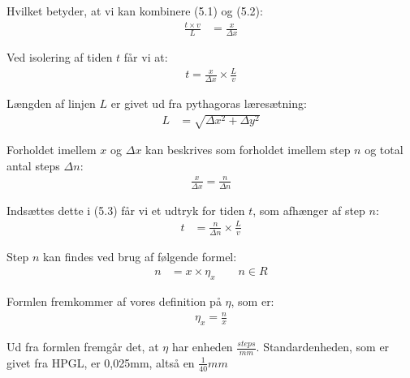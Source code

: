 Hvilket betyder, at vi kan kombinere (5.1) og (5.2):
\begin{align*}
\frac{t \times v}{L} &= \frac{x}{\Delta x}
\end{align*}

Ved isolering af tiden $t$ får vi at:
\begin{align}
t = \frac{x}{\Delta x} \times \frac{L}{v}
\end{align}

Længden af linjen $L$ er givet ud fra pythagoras læresætning:
\begin{align*}
L &= \sqrt{\Delta x^2+\Delta y^2}
\end{align*}

Forholdet imellem $x$ og $\Delta x$ kan beskrives som forholdet imellem step $n$ og total antal steps $\Delta n$:
\begin{align}
\frac{x}{\Delta x} = \frac{n}{\Delta n}
\end{align}

Indsættes dette i (5.3) får vi et udtryk for tiden $t$, som afhænger af step $n$:
\begin{align}
t &= \frac{n}{\Delta n} \times \frac{L}{v}
\end{align}

Step $n$ kan findes ved brug af følgende formel:
\begin{align}
n &= x \times \eta_x \qquad n \in{R}
\end{align}

Formlen fremkommer af vores definition på $\eta$, som er:
\begin{align*}
\eta_x = \frac{n}{x}
\end{align*}

Ud fra formlen fremgår det, at $\eta$ har enheden $\frac{steps}{mm}$.
Standardenheden, som er givet fra HPGL, er 0,025mm, altså en $\frac{1}{40}mm$


